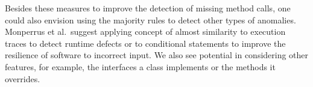Besides these measures to improve the detection of missing method calls, one could also envision using the majority rules to detect other types of anomalies.
Monperrus et al.\ suggest applying concept of almost similarity to execution traces to detect runtime defects or to conditional statements to improve the resilience of software to incorrect input.
We also see potential in considering other features, for example, the interfaces a class implements or the methods it overrides.

